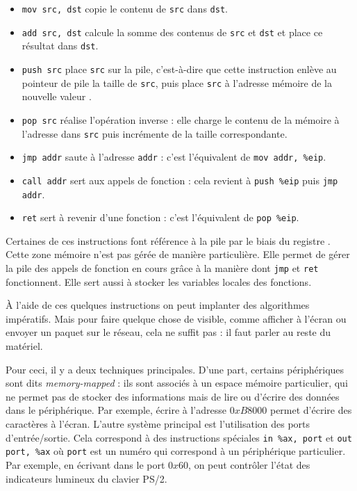 \begin{itemize}

\item \texttt{mov src, dst} copie le contenu de \texttt{src} dans \texttt{dst}.

\item \texttt{add src, dst} calcule la somme des contenus de \texttt{src} et
  \texttt{dst} et place ce résultat dans \texttt{dst}.

\item \texttt{push src} place \texttt{src} sur la pile, c'est-à-dire que cette
  instruction enlève au pointeur de pile \esp la taille de \texttt{src}, puis
  place \texttt{src} à l'adresse mémoire de la nouvelle valeur \esp.

\item \texttt{pop src} réalise l'opération inverse : elle charge le contenu de
  la mémoire à l'adresse \esp dans \texttt{src} puis incrémente \esp de la
  taille correspondante.

\item \texttt{jmp addr} saute à l'adresse \texttt{addr} : c'est l'équivalent de
  \texttt{mov addr, \%eip}.

\item \texttt{call addr} sert aux appels de fonction : cela revient à
  \texttt{push \%eip} puis \texttt{jmp addr}.

\item \texttt{ret} sert à revenir d'une fonction : c'est l'équivalent de
  \texttt{pop \%eip}.

\end{itemize}

Certaines de ces instructions font référence à la pile par le biais du registre
\esp. Cette zone mémoire n'est pas gérée de manière particulière. Elle permet de
gérer la pile des appels de fonction en cours grâce à la manière dont
\texttt{jmp} et \texttt{ret} fonctionnent. Elle sert aussi à stocker les
variables locales des fonctions.

À l'aide de ces quelques instructions on peut implanter des algorithmes
impératifs. Mais pour faire quelque chose de visible, comme afficher à l'écran
ou envoyer un paquet sur le réseau, cela ne suffit pas : il faut parler au reste
du matériel.

Pour ceci, il y a deux techniques principales. D'une part, certains
périphériques sont dits \emph{memory-mapped} : ils sont associés à un espace
mémoire particulier, qui ne permet pas de stocker des informations mais de lire
ou d'écrire des données dans le périphérique. Par exemple, écrire à l'adresse
$0xB8000$ permet d'écrire des caractères à l'écran. L'autre système principal
est l'utilisation des ports d'entrée/sortie. Cela correspond à des instructions
spéciales \texttt{in \%ax, port} et \texttt{out port, \%ax} où \texttt{port}
est un numéro qui correspond à un périphérique particulier. Par exemple, en
écrivant dans le port $0x60$, on peut contrôler l'état des indicateurs
lumineux du clavier PS/2.

